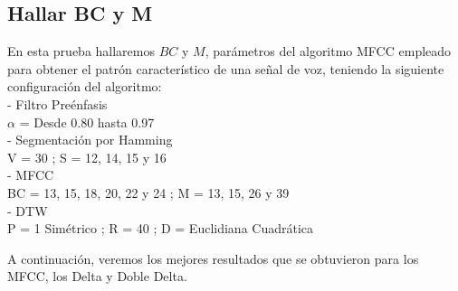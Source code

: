 \subsection{Hallar BC y M}
En esta prueba hallaremos $BC$ y $M$, parámetros del algoritmo MFCC empleado para obtener el patrón característico de una señal de voz, teniendo la siguiente configuración del algoritmo:\\
- Filtro Preénfasis \\
\hspace*{1cm} $\alpha$ = Desde 0.80 hasta 0.97 \\
- Segmentación por Hamming\\
\hspace*{1cm} V = 30 ; \qquad S = 12, 14, 15 y 16\\
- MFCC\\
\hspace*{1cm} BC = 13, 15, 18, 20, 22 y 24 ; \qquad M = 13, 15, 26 y 39\\
- DTW\\
\hspace*{1cm} P = 1 Simétrico ; \qquad R = 40 ; \qquad D = Euclidiana Cuadrática

\vskip 0.5cm
A continuación, veremos los mejores resultados que se obtuvieron para los MFCC, los Delta y Doble Delta.

